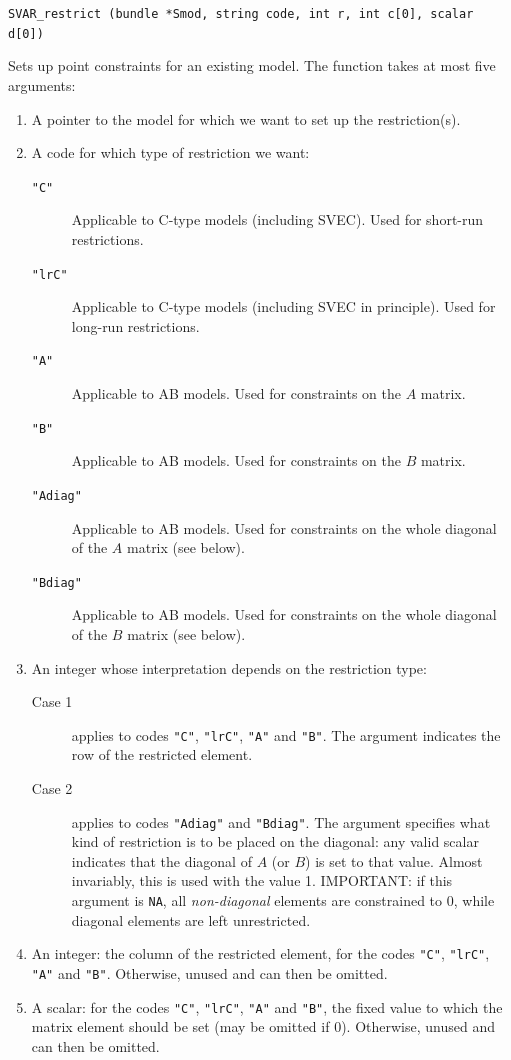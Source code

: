 \documentclass[a4paper,10pt]{article}
\newenvironment{funcdoc}[1]
{\noindent\hrulefill\newline\nopagebreak\texttt{#1}%
\nopagebreak\par\noindent\hrulefill%
\nopagebreak\par\nopagebreak\smallskip\nopagebreak\par}
{\bigskip}
\newcounter{script}[section]
\begin{document}
\begin{funcdoc}{SVAR\_restrict (bundle *Smod, string code, int r, int c[0], scalar d[0])}
  \noindent Sets up point constraints for an existing model. The function
  takes at most five arguments:
\begin{enumerate}
\item A pointer to the model for which we want to set up the
  restriction(s).
\item A code for which type of restriction we want: 
  \begin{description}
  \item[\texttt{"C"}] Applicable to C-type models (including SVEC). Used for short-run
    restrictions.
  \item[\texttt{"lrC"}] Applicable to C-type models (including SVEC in principle). 
    Used for long-run restrictions.
  \item[\texttt{"A"}] Applicable to AB models. Used for constraints on
    the $A$ matrix.
  \item[\texttt{"B"}] Applicable to AB models. Used for constraints on
    the $B$ matrix.
  \item[\texttt{"Adiag"}] Applicable to AB models. Used for constraints on
    the whole diagonal of the $A$ matrix (see below).
  \item[\texttt{"Bdiag"}] Applicable to AB models. Used for constraints on
    the whole diagonal of the $B$ matrix (see below).
  \end{description}
\item An integer whose interpretation depends on the restriction type:
  \begin{description}
  \item[Case 1] applies to codes \texttt{"C"}, \texttt{"lrC"},
    \texttt{"A"} and \texttt{"B"}. The argument indicates the row of
    the restricted element.
  \item[Case 2] applies to codes \texttt{"Adiag"} and
    \texttt{"Bdiag"}. The argument specifies what kind of restriction
    is to be placed on the diagonal: any valid scalar indicates that
    the diagonal of $A$ (or $B$) is set to that value. Almost
    invariably, this is used with the value 1. IMPORTANT: if this
    argument is \texttt{NA}, all \emph{non-diagonal} elements are
    constrained to 0, while diagonal elements are left unrestricted.
  \end{description}
\item An integer: the column of the restricted element, for the codes
  \texttt{"C"}, \texttt{"lrC"}, \texttt{"A"} and
  \texttt{"B"}. Otherwise, unused and can then be omitted.
\item A scalar: for the codes \texttt{"C"}, \texttt{"lrC"},
  \texttt{"A"} and \texttt{"B"}, the fixed value to which the matrix
  element should be set (may be omitted if 0). Otherwise, unused and
  can then be omitted.
\end{enumerate}


\end{funcdoc}
\end{document}
